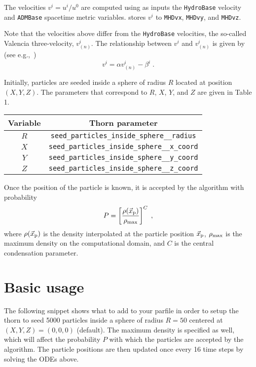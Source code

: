 The velocities $v^{i} = u^{i}/u^{0}$ are computed using as inputs the
\texttt{HydroBase} velocity and \texttt{ADMBase} spacetime metric
variables. \thornname{} stores $v^{i}$ to \texttt{MHDvx}, \texttt{MHDvy},
and \texttt{MHDvz}.

Note that the velocities above differ from the \texttt{HydroBase}
velocities, the so-called Valencia three-velocity, $v^{i}_{(n)}$. The
relationship between $v^{i}$ and $v^{i}_{(n)}$ is given by (see
e.g.,~\cite{etienne2015illinoisgrmhd})
\begin{equation}
  v^{i} = \alpha v^{i}_{(n)} - \beta^{i}\;.
\end{equation}

Initially, particles are seeded inside a sphere of radius $R$ located at
position $(X,Y,Z)$. The parameters that correspond to $R$, $X$, $Y$, and
$Z$ are given in Table 1.

\begin{table}
  \centering
  \begin{tabular}{c c}
    \hline
    \hline
    Variable & Thorn parameter\\
    \hline
    $R$ & \verb|seed_particles_inside_sphere__radius|\\
    $X$ & \verb|seed_particles_inside_sphere__x_coord|\\
    $Y$ & \verb|seed_particles_inside_sphere__y_coord|\\
    $Z$ & \verb|seed_particles_inside_sphere__z_coord|\\
    \hline
    \hline
  \end{tabular}
\end{table}

Once the position of the particle is known, it is accepted by the
algorithm with probability
\begin{equation}
  P = \left[\frac{\rho(\vec{x}_{\rm p})}{\rho_{\rm max}}\right]^{C}\;,
\end{equation}
where $\rho(\vec{x}_{\rm p})$ is the density interpolated at the
particle position $\vec{x}_{\rm p}$, $\rho_{\rm max}$ is the maximum
density on the computational domain, and $C$ is the central condensation
parameter.

\section{Basic usage}
\label{sec:basic_usage}

The following snippet shows what to add to your parfile in order to
setup the thorn to seed 5000 particles inside a sphere of radius $R=50$
centered at $(X,Y,Z)=(0,0,0)$ (default). The maximum density is
specified as well, which will affect the probability $P$ with which the
particles are accepted by the algorithm. The particle positions are then
updated once every 16 time steps by solving the ODEs above.

